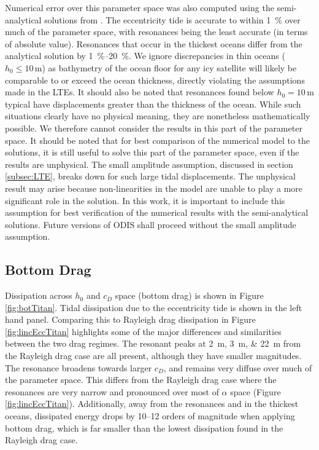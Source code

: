 Numerical error over this parameter space was also computed using the semi-analytical solutions from \citet{matsuyama2014tidal}. The eccentricity tide is accurate to within \SI{1}{\percent} over much of the parameter space, with resonances being the least accurate (in terms of absolute value). Resonances that occur in the thickest oceans differ from the analytical solution by \SIrange{1}{20}{\percent}. We ignore discrepancies in thin oceans ($h_0 \leq 10 \, \si{\metre}$) as bathymetry of the ocean floor for any icy satellite will likely be comparable to or exceed the ocean thickness, directly violating the assumptions made in the LTEs. It should also be noted that resonances found below $h_0 = 10 \, \si{\metre}$ typical have displacements greater than the thickness of the ocean. While such situations clearly have no physical meaning, they are nonetheless mathematically possible. We therefore cannot consider the results in this part of the parameter space. It should be noted that for best comparison of the numerical model to the \citet{matsuyama2014tidal} solutions, it is still useful to solve this part of the parameter space, even if the results are unphysical. The small amplitude assumption, discussed in section \ref{subsec:LTE}, breaks down for such large tidal displacements. The unphysical result may arise because non-linearities in the model are unable to play a more significant role in the solution. In this work, it is important to include this assumption for best verification of the numerical results with the semi-analytical solutions. Future versions of ODIS shall proceed without the small amplitude assumption.

\subsection{Bottom Drag \label{subsec:botTitan}}

Dissipation across $h_0$ and $c_D$ space (bottom drag) is shown in Figure \ref{fig:botTitan}. Tidal dissipation due to the eccentricity tide is shown in the left hand panel. Comparing this to Rayleigh drag dissipation in Figure \ref{fig:lincEccTitan} highlights some of the major differences and similarities between the two drag regimes. The resonant peaks at \SIlist{2;3;22}{\metre} from the Rayleigh drag case are all present, although they have smaller magnitudes. The resonance broadens towards larger $c_D$, and remains very diffuse over much of the parameter space. This differs from the Rayleigh drag case where the resonances are very narrow and pronounced over most of $\alpha$ space (Figure \ref{fig:lincEccTitan}). Additionally, away from the resonances and in the thickest oceans, dissipated energy drops by \numrange{10}{12} orders of magnitude when applying bottom drag, which is far smaller than the lowest dissipation found in the Rayleigh drag case.  

